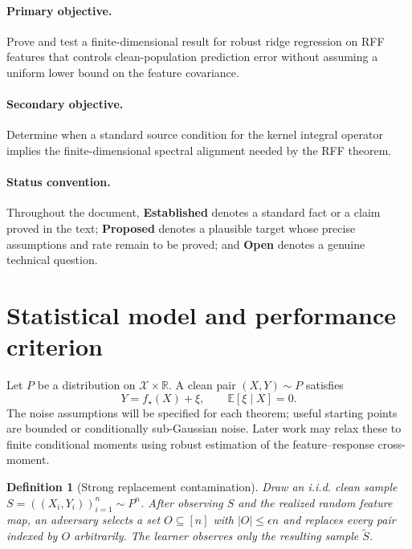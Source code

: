 \documentclass[11pt]{article}
\newtheorem{definition}{Definition}[section]
\newcommand{\R}{\mathbb{R}}
\newcommand{\E}{\mathbb{E}}
\newcommand{\status}[2]{\textcolor{#1}{\textbf{#2}}}
\begin{document}
\paragraph{Primary objective.}
Prove and test a finite-dimensional result for robust ridge regression on RFF
features that controls clean-population prediction error without assuming a
uniform lower bound on the feature covariance.

\paragraph{Secondary objective.}
Determine when a standard source condition for the kernel integral operator
implies the finite-dimensional spectral alignment needed by the RFF theorem.

\paragraph{Status convention.}
Throughout the document,
\status{established}{Established} denotes a standard fact or a claim proved in
the text; \status{proposed}{Proposed} denotes a plausible target whose precise
assumptions and rate remain to be proved; and \status{open}{Open} denotes a
genuine technical question.

\section{Statistical model and performance criterion}

Let $P$ be a distribution on $\mathcal X\times\R$.  A clean pair $(X,Y)\sim P$
satisfies
\begin{equation}\label{eq:model}
  Y=f_\star(X)+\xi, \qquad \E[\xi\mid X]=0.
\end{equation}
The noise assumptions will be specified for each theorem; useful starting
points are bounded or conditionally sub-Gaussian noise.  Later work may relax
these to finite conditional moments using robust estimation of the
feature--response cross-moment.

\begin{definition}[Strong replacement contamination]
Draw an i.i.d. clean sample $S=((X_i,Y_i))_{i=1}^n\sim P^n$.  After observing
$S$ and the realized random feature map, an adversary selects a set
$O\subseteq[n]$ with $|O|\leq \epsilon n$ and replaces every pair indexed by
$O$ arbitrarily.  The learner observes only the resulting sample
$\widetilde S$.
\end{definition}
\end{document}
